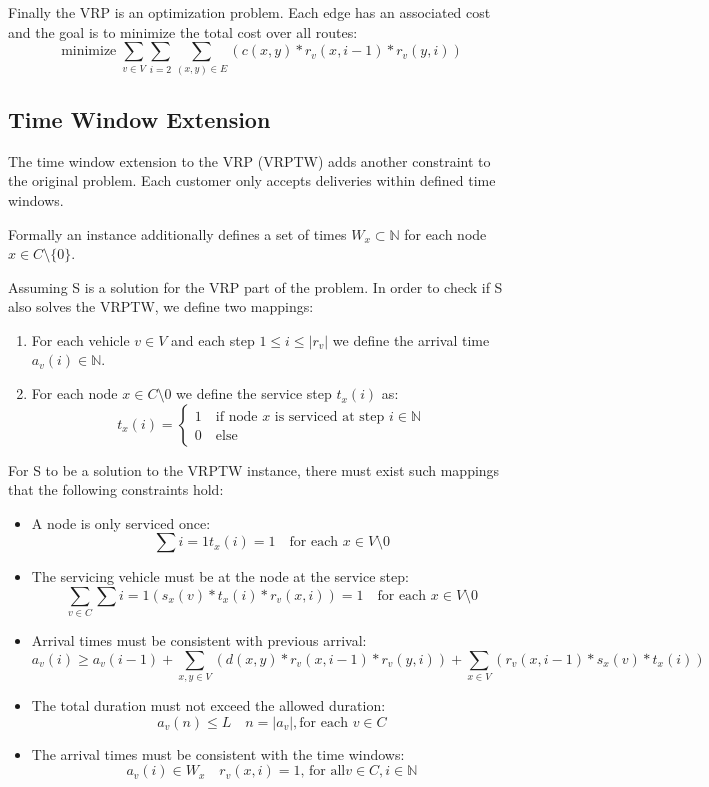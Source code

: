 \documentclass[12pt, letterpaper]{article}
\DeclareMathOperator*{\minimize}{minimize}
\begin{document}
Finally the VRP is an optimization problem. Each edge has an associated cost and the goal is to minimize the total cost over all routes:
$$\displaystyle{\minimize \sum_{v \in V} \sum_{i=2}\sum_{(x,y) \in E} (c(x,y) * r_v(x,i-1) * r_v(y,i))}$$

\subsection{Time Window Extension}
The time window extension to the VRP (VRPTW) adds another constraint to the original problem. Each customer only accepts deliveries within defined time windows.

Formally an instance additionally defines a set of times $W_x \subset \mathbb{N}$ for each node $x \in C \setminus \{0\}$.

Assuming S is a solution for the VRP part of the problem. In order to check if S also solves the VRPTW, we define two mappings:
\begin{enumerate}
	\item For each vehicle $v \in V$ and each step $1 \leq i \leq |r_v|$ we define the arrival time $a_v(i) \in \mathbb{N}$.
	\item For each node $x \in C \setminus {0}$ we define the service step $t_x(i)$ as:
		$$t_x(i) = \begin{cases}
			1	\quad \text{if node } x \text{ is serviced at step } i \in \mathbb{N}\\
			0	\quad \text{else}
		\end{cases}$$ 
\end{enumerate}

For S to be a solution to the VRPTW instance, there must exist such mappings that the following constraints hold:
\begin{itemize}
	\item A node is only serviced once:\\
		$$\sum{i=1} t_x(i) = 1 \quad \text{for each } x \in V \setminus {0}$$
	\item The servicing vehicle must be at the node at the service step:\\
		$$\sum_{v \in C} \sum{i=1} (s_x(v) *  t_x(i) * r_v(x,i)) = 1 \quad \text{for each } x \in V \setminus {0}$$
	\item Arrival times must be consistent with previous arrival:\\
		$$a_v(i) \geq a_v(i-1) + \sum_{x,y \in V} (d(x,y) * r_v(x,i-1) * r_v(y,i)) + \sum_{x \in V} (r_v(x, i-1) * s_x(v) * t_x(i))$$
	\item The total duration must not exceed the allowed duration: \\
		$$a_v(n) \leq L \quad n = |a_v|, \text{for each } v \in C$$
	\item The arrival times must be consistent with the time windows:\\
		$$a_v(i) \in W_x \quad r_v(x,i)  = 1 \text{, for all} v \in C, i \in \mathbb{N}$$
\end{itemize}
\end{document}
